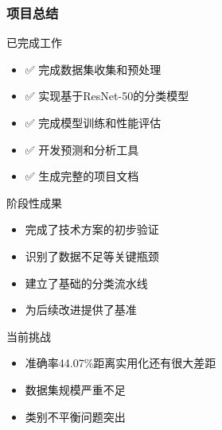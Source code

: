 \documentclass[10pt]{beamer}
\begin{document}
\begin{frame}
\frametitle{项目总结}
\begin{block}{已完成工作}
\begin{itemize}
    \item ✅ 完成数据集收集和预处理
    \item ✅ 实现基于ResNet-50的分类模型
    \item ✅ 完成模型训练和性能评估
    \item ✅ 开发预测和分析工具
    \item ✅ 生成完整的项目文档
\end{itemize}
\end{block}

\begin{block}{阶段性成果}
\begin{itemize}
    \item 完成了技术方案的初步验证
    \item 识别了数据不足等关键瓶颈
    \item 建立了基础的分类流水线
    \item 为后续改进提供了基准
\end{itemize}
\end{block}

\begin{alertblock}{当前挑战}
\begin{itemize}
    \item 准确率44.07\%距离实用化还有很大差距
    \item 数据集规模严重不足
    \item 类别不平衡问题突出
\end{itemize}
\end{alertblock}
\end{frame}
\end{document}

